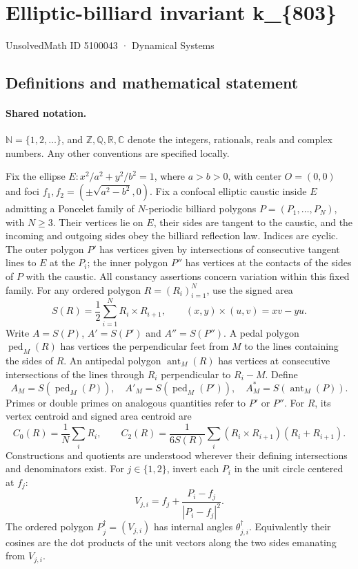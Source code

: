 \documentclass[11pt]{article}
\begin{document}
\setcounter{section}{5100042}
\section{Elliptic-billiard invariant k\_\{803\}}\label{5100043}
{\small\sffamily UnsolvedMath ID 5100043 · Dynamical Systems}
\subsection{Definitions and mathematical statement}

\paragraph{Shared notation.}$\mathbb N=\{1,2,\ldots\}$, and $\mathbb Z,\mathbb Q,\mathbb R,\mathbb C$ denote the integers, rationals, reals and complex numbers. Any other conventions are specified locally.


Fix the ellipse $E:x^2/a^2+y^2/b^2=1$, where $a>b>0$, with center $O=(0,0)$ and foci $f_1,f_2=(\pm\sqrt{a^2-b^2},0)$. Fix a confocal elliptic caustic inside $E$ admitting a Poncelet family of $N$-periodic billiard polygons $P=(P_1,\ldots,P_N)$, with $N\geq3$. Their vertices lie on $E$, their sides are tangent to the caustic, and the incoming and outgoing sides obey the billiard reflection law. Indices are cyclic. The outer polygon $P'$ has vertices given by intersections of consecutive tangent lines to $E$ at the $P_i$; the inner polygon $P''$ has vertices at the contacts of the sides of $P$ with the caustic. All constancy assertions concern variation within this fixed family.
For any ordered polygon $R=(R_i)_{i=1}^N$, use the signed area
\[S(R)=\frac12\sum_{i=1}^N R_i\times R_{i+1},\qquad (x,y)\times(u,v)=xv-yu.\]
Write $A=S(P)$, $A'=S(P')$ and $A''=S(P'')$. A pedal polygon $\operatorname{ped}_M(R)$ has vertices the perpendicular feet from $M$ to the lines containing the sides of $R$. An antipedal polygon $\operatorname{ant}_M(R)$ has vertices at consecutive intersections of the lines through $R_i$ perpendicular to $R_i-M$. Define
\[A_M=S(\operatorname{ped}_M(P)),\quad A'_M=S(\operatorname{ped}_M(P')),\quad A_M^*=S(\operatorname{ant}_M(P)).\]
Primes or double primes on analogous quantities refer to $P'$ or $P''$. For $R$, its vertex centroid and signed area centroid are
\[C_0(R)=\frac1N\sum_i R_i,\qquad C_2(R)=\frac{1}{6S(R)}\sum_i(R_i\times R_{i+1})(R_i+R_{i+1}).\]
Constructions and quotients are understood wherever their defining intersections and denominators exist.
For $j\in\{1,2\}$, invert each $P_i$ in the unit circle centered at $f_j$:
\[V_{j,i}=f_j+\frac{P_i-f_j}{|P_i-f_j|^2}.\]
The ordered polygon $P_j^\dagger=(V_{j,i})$ has internal angles $\theta_{j,i}^\dagger$. Equivalently their cosines are the dot products of the unit vectors along the two sides emanating from $V_{j,i}$.
\end{document}
